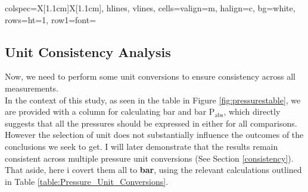 \documentclass{article}
\newcounter{dataset}
\newenvironment{datasetbox}[2]{
	\refstepcounter{dataset}
	\begin{tcolorbox}[
		title={\color{black}\textbf{Dataset \thedataset: #1}},
		colback=black!4!white,
		colframe=black!10!white,
		boxrule=0.5mm,
		width=\textwidth,
		label={#2}]
	}{\end{tcolorbox}}
\begin{document}
\begin{minipage}{1.1\textwidth}
\begin{datasetbox}{Calibrated Data}{data:zero}
\begin{minipage}{0.76\textwidth}
\begin{tcolorbox}[
			title={\color{black}\normalsize \textbf{Pressure measuring instruments}},
			colback=MetallicSunburst!6!white, 
			colframe=ChineseGold!30!white, 
			boxrule=0.5mm, 
			width=1\textwidth
			]
\begin{minipage}{1.01\textwidth}
\begin{minipage}{0.22\textwidth}
\begin{tblr}{
							colspec={X[1.1cm]X[1.1cm]},
							hlines, vlines,
							cells={valign=m, halign=c, bg=white},
							rows={ht=1\baselineskip},
							row{1}={font=\bfseries}
						}
					\end{tblr}
				\end{minipage}
			\end{minipage}		
		\end{tcolorbox}		
	\end{minipage}
\end{datasetbox}
	\end{minipage}
	
\newpage{}
\subsection{Unit Consistency Analysis}
Now, we need to perform some unit conversions to ensure consistency across all measurements.\\[8pt]
In the context of this study, as seen in the table in Figure \ref{fig:pressurestable}, we are provided with a column for calculating bar and bar \(\text{P}_\text{abs}\), which directly suggests that all the pressures should be expressed in either for all comparisons.\\[8pt] However the selection of unit does not substantially influence the outcomes of the conclusions we seek to get. I will later demonstrate that the results remain consistent across multiple pressure unit conversions (See Section \ref{consistency}).\\[8pt]
That aside, here i covert them all to \textbf{bar}, using the relevant calculations outlined in Table \ref{table:Pressure_Unit_Conversions}.
\end{document}
